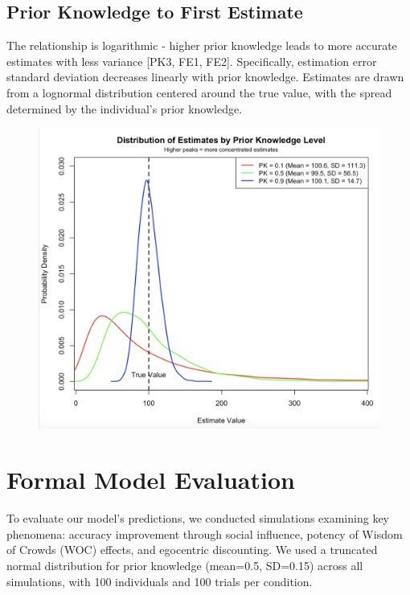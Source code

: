 \documentclass[
  man,floatsintext]{apa6}
\begin{document}
\hypertarget{prior-knowledge-to-first-estimate}{%
\subsection{Prior Knowledge to First Estimate}\label{prior-knowledge-to-first-estimate}}

The relationship is logarithmic - higher prior knowledge leads to more accurate estimates with less variance {[}PK3, FE1, FE2{]}. Specifically, estimation error standard deviation decreases linearly with prior knowledge. Estimates are drawn from a lognormal distribution centered around the true value, with the spread determined by the individual's prior knowledge.

\begin{figure}[H]
\includegraphics[width=4.56in]{photos/pk_estimate} \caption{ }\label{fig:unnamed-chunk-4}
\end{figure}

\hypertarget{formal-model-evaluation}{%
\section{Formal Model Evaluation}\label{formal-model-evaluation}}

To evaluate our model's predictions, we conducted simulations examining key phenomena: accuracy improvement through social influence, potency of Wisdom of Crowds (WOC) effects, and egocentric discounting. We used a truncated normal distribution for prior knowledge (mean=0.5, SD=0.15) across all simulations, with 100 individuals and 100 trials per condition.
\end{document}
